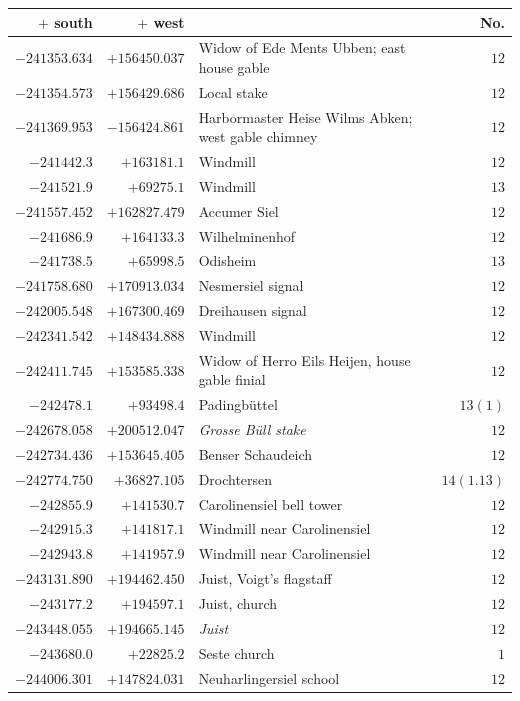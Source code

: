 \begin{center}\begingroup\fontsize{8}{9}\selectfont
\setlength{\tabcolsep}{4pt}
\begin{tabular}{r|r|p{170pt}|r}\hline
\(+\) south&\(+\) west&&No.\\\hline
\(-241353.634\)&\(+156450.037\)&Widow of Ede Ments Ubben; east house gable&\(12\)\\
\(-241354.573\)&\(+156429.686\)&Local stake&\(12\)\\
\(-241369.953\)&\(-156424.861\)&Harbormaster Heise Wilms Abken; west gable chimney&\(12\)\\
\(-241442.3\)&\(+163181.1\)&Windmill&\(12\)\\
\(-241521.9\)&\(+69275.1\)&Windmill&\(13\)\\
\(-241557.452\)&\(+162827.479\)&Accumer Siel&\(12\)\\
\(-241686.9\)&\(+164133.3\)&Wilhelminenhof&\(12\)\\
\(-241738.5\)&\(+65998.5\)&Odisheim&\(13\)\\
\(-241758.680\)&\(+170913.034\)&Nesmersiel signal&\(12\)\\
\(-242005.548\)&\(+167300.469\)&Dreihausen signal&\(12\)\\
\(-242341.542\)&\(+148434.888\)&Windmill&\(12\)\\
\(-242411.745\)&\(+153585.338\)&Widow of Herro Eils Heijen, house gable finial&\(12\)\\
\(-242478.1\)&\(+93498.4\)&Padingbüttel&\(13(1)\)\\
\(-242678.058\)&\(+200512.047\)&\textit{Grosse Büll stake}&\(12\)\\
\(-242734.436\)&\(+153645.405\)&Benser Schaudeich&\(12\)\\
\(-242774.750\)&\(+36827.105\)&Drochtersen&\(14(1.13)\)\\
\(-242855.9\)&\(+141530.7\)&Carolinensiel bell tower&\(12\)\\
\(-242915.3\)&\(+141817.1\)&Windmill near Carolinensiel&\(12\)\\
\(-242943.8\)&\(+141957.9\)&Windmill near Carolinensiel&\(12\)\\
\(-243131.890\)&\(+194462.450\)&Juist, Voigt’s flagstaff&\(12\)\\
\(-243177.2\)&\(+194597.1\)&Juist, church&\(12\)\\
\(-243448.055\)&\(+194665.145\)&\textit{Juist}&\(12\)\\
\(-243680.0\)&\(+22825.2\)&Seste church&\(1\)\\
\(-244006.301\)&\(+147824.031\)&Neuharlingersiel school&\(12\)\\

\end{tabular}
\end{center}
